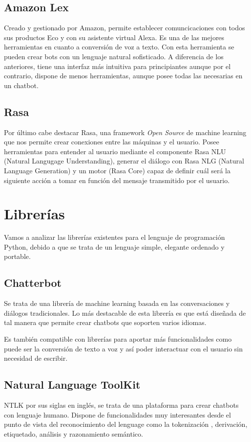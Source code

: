 \subsection{Amazon Lex}
Creado y gestionado por Amazon, permite establecer comuncicaciones con todos sus productos Eco y con su asistente virtual Alexa. Es una de las mejores herramientas en cuanto a conversión de voz a texto. Con esta herramienta se pueden crear bots con un lenguaje natural sofisticado. A diferencia de los anteriores, tiene una interfaz más intuitiva para principiantes aunque por el contrario, dispone de menos herramientas, aunque posee todas las necesarias en un chatbot.

\subsection{Rasa}
Por último cabe destacar Rasa, una framework \textit{Open Source} de machine learning que nos permite crear conexiones entre las máquinas y el usuario. Posee herramientas para entender al usuario mediante el componente Rasa NLU (Natural Langugage Understanding), generar el diálogo con Rasa NLG (Natural Language Generation) y un motor (Rasa Core) capaz de definir cuál será la siguiente acción a tomar en función del mensaje transmitido por el usuario.   

\vspace{1cm}
\section{Librerías}
Vamos a analizar las librerías existentes para el lenguaje de programación Python, debido a que se trata de un lenguaje simple, elegante ordenado y portable.

\subsection{Chatterbot}
Se trata de una librería de machine learning basada en las conversaciones y diálogos tradicionales. Lo más destacable de esta librería es que está diseñada de tal manera que permite crear chatbots que soporten varios idiomas. 

Es también compatible con librerías para aportar más funcionalidades como puede ser la conversión de texto a voz y así poder interactuar con el usuario sin necesidad de escribir.

\subsection{Natural Language ToolKit} NTLK por sus siglas en inglés, se trata de una plataforma para crear chatbots con lenguaje humano. Dispone de funcionalidades muy interesantes desde el punto de vista del reconocimiento del lenguage como la tokenización , derivación, etiquetado, análisis y razonamiento semántico.

